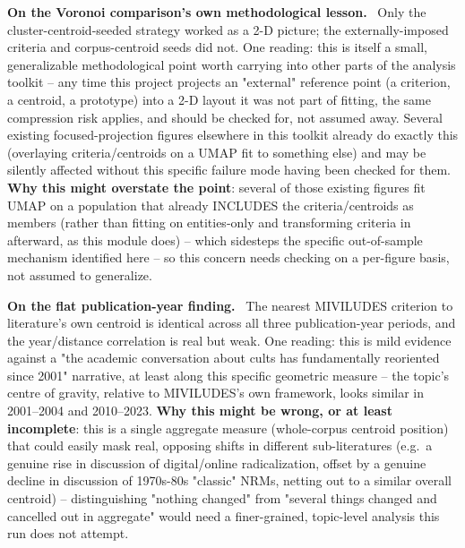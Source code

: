 \documentclass[11pt,a4paper]{article}
\newenvironment{interpbox}[1][Possible interpretation]
  {\par\vspace{6pt}\noindent{\color{interpline}\rule{\linewidth}{0.8pt}}\par\vspace{3pt}
   \noindent\small\textcolor{interpline}{\textbf{#1.}}\ \ignorespaces}
  {\par\vspace{3pt}\noindent{\color{interpline}\rule{\linewidth}{0.8pt}}\vspace{6pt}\par}
\begin{document}
\begin{interpbox}[On the Voronoi comparison's own methodological lesson]
Only the cluster-centroid-seeded strategy worked as a 2-D picture; the
externally-imposed criteria and corpus-centroid seeds did not. One
reading: this is itself a small, generalizable methodological point worth
carrying into other parts of the analysis toolkit -- any time this
project projects an "external" reference point (a criterion, a centroid,
a prototype) into a 2-D layout it was not part of fitting, the same
compression risk applies, and should be checked for, not assumed away.
Several existing focused-projection figures elsewhere in this toolkit
already do exactly this (overlaying criteria/centroids on a UMAP fit to
something else) and may be silently affected without this specific
failure mode having been checked for them. \textbf{Why this might
overstate the point}: several of those existing figures fit UMAP on a
population that already INCLUDES the criteria/centroids as members
(rather than fitting on entities-only and transforming criteria in
afterward, as this module does) -- which sidesteps the specific
out-of-sample mechanism identified here -- so this concern needs
checking on a per-figure basis, not assumed to generalize.
\end{interpbox}

\begin{interpbox}[On the flat publication-year finding]
The nearest MIVILUDES criterion to literature's own centroid is
identical across all three publication-year periods, and the
year/distance correlation is real but weak. One reading: this is mild
evidence against a "the academic conversation about cults has
fundamentally reoriented since 2001" narrative, at least along this
specific geometric measure -- the topic's centre of gravity, relative to
MIVILUDES's own framework, looks similar in 2001--2004 and 2010--2023.
\textbf{Why this might be wrong, or at least incomplete}: this is a
single aggregate measure (whole-corpus centroid position) that could
easily mask real, opposing shifts in different sub-literatures (e.g.\ a
genuine rise in discussion of digital/online radicalization, offset by a
genuine decline in discussion of 1970s-80s "classic" NRMs, netting out to
a similar overall centroid) -- distinguishing "nothing changed" from
"several things changed and cancelled out in aggregate" would need a
finer-grained, topic-level analysis this run does not attempt.
\end{interpbox}

\end{document}
